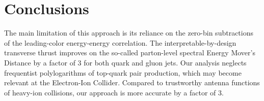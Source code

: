 \section{Conclusions}\label{sec:conclusions}

The main limitation of this approach is its reliance on the zero-bin
subtractions of the leading-color energy-energy correlation. The
interpretable-by-design transverse thrust improves on the so-called
parton-level spectral Energy Mover's Distance by a factor of 3 for both
quark and gluon jets. Our analysis neglects frequentist polylogarithms
of top-quark pair production, which may become relevant at the
Electron-Ion Collider. Compared to trustworthy antenna functions of
heavy-ion collisions, our approach is more accurate by a factor of 3.

